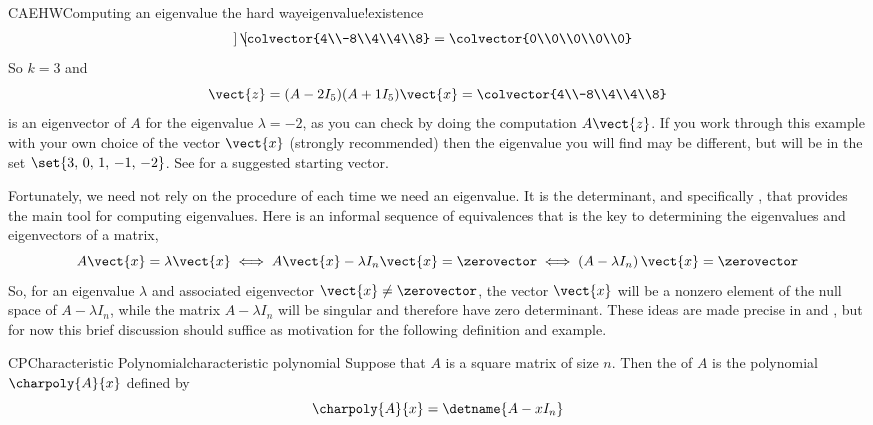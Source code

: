 \begin{example}{CAEHW}{Computing an eigenvalue the hard way}{eigenvalue!existence}
\begin{align*}
\begin{bmatrix}
\end{bmatrix}
\colvector{4\\-8\\4\\4\\8}
=
\colvector{0\\0\\0\\0\\0}\\
\end{align*}
%
So $k=3$ and
%
\begin{equation*}
\vect{z}=(A-2I_5)(A+1I_5)\vect{x}=\colvector{4\\-8\\4\\4\\8}
\end{equation*}
%
is an eigenvector of $A$ for the eigenvalue $\lambda=-2$, as you can check by doing the computation $A\vect{z}$.  If you work through this example with your own choice of the vector $\vect{x}$ (strongly recommended) then the  eigenvalue you will find may be different, but will be in the set $\set{3,\,0,\,1,\,-1,\,-2}$.  See  for a suggested starting vector.
%
\end{example}
%
%
Fortunately, we need not rely on the procedure of  each time we need an eigenvalue.  It is the determinant, and specifically , that provides the main tool for computing eigenvalues.  Here is an informal sequence of equivalences that is the key to determining the eigenvalues and eigenvectors of a matrix,
%
\begin{equation*}
A\vect{x}=\lambda\vect{x}\iff
A\vect{x}-\lambda I_n\vect{x}=\zerovector\iff
\left(A-\lambda I_n\right)\vect{x}=\zerovector
\end{equation*}
%
So, for an eigenvalue $\lambda$ and associated eigenvector $\vect{x}\neq\zerovector$, the vector $\vect{x}$ will be a nonzero element of the null space of $A-\lambda I_n$, while the matrix $A-\lambda I_n$ will be singular and therefore have zero determinant.  These ideas are made precise in  and , but for now this brief discussion should suffice as motivation for the following definition and example.
%
\begin{definition}{CP}{Characteristic Polynomial}{characteristic polynomial}
Suppose that $A$ is a square matrix of size $n$.  Then the  of $A$ is the polynomial $\charpoly{A}{x}$ defined by
%
\begin{equation*}
\charpoly{A}{x}=\detname{A-xI_n}
\end{equation*}
%
\end{definition}
